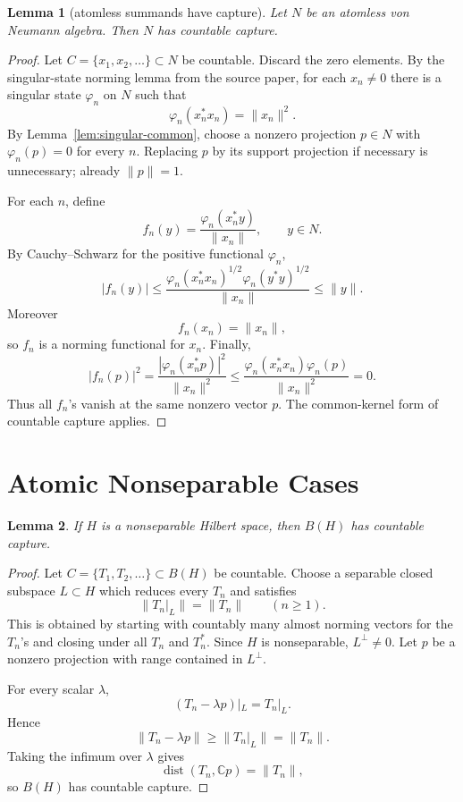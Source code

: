 \documentclass[11pt]{article}
\newtheorem{lemma}{Lemma}
\newcommand{\C}{\mathbb C}
\newcommand{\dist}{\operatorname{dist}}
\begin{document}
\begin{lemma}[atomless summands have capture]
\label{lem:atomless}
Let \(N\) be an atomless von Neumann algebra.  Then \(N\) has countable
capture.
\end{lemma}

\begin{proof}
Let \(C=\{x_1,x_2,\ldots\}\subset N\) be countable.  Discard the zero
elements.  By the singular-state norming lemma from the source paper, for
each \(x_n\ne0\) there is a singular state \(\varphi_n\) on \(N\) such that
\[
        \varphi_n(x_n^*x_n)=\|x_n\|^2.
\]
By Lemma~\ref{lem:singular-common}, choose a nonzero projection \(p\in N\)
with \(\varphi_n(p)=0\) for every \(n\).  Replacing \(p\) by its support
projection if necessary is unnecessary; already \(\|p\|=1\).

For each \(n\), define
\[
        f_n(y)=\frac{\varphi_n(x_n^*y)}{\|x_n\|},
        \qquad y\in N.
\]
By Cauchy--Schwarz for the positive functional \(\varphi_n\),
\[
        |f_n(y)|
        \le
        \frac{\varphi_n(x_n^*x_n)^{1/2}\varphi_n(y^*y)^{1/2}}{\|x_n\|}
        \le
        \|y\|.
\]
Moreover
\[
        f_n(x_n)=\|x_n\|,
\]
so \(f_n\) is a norming functional for \(x_n\).  Finally,
\[
        |f_n(p)|^2
        =
        \frac{|\varphi_n(x_n^*p)|^2}{\|x_n\|^2}
        \le
        \frac{\varphi_n(x_n^*x_n)\varphi_n(p)}{\|x_n\|^2}
        =
        0.
\]
Thus all \(f_n\)'s vanish at the same nonzero vector \(p\).  The common-kernel
form of countable capture applies.
\end{proof}

\section*{Atomic Nonseparable Cases}

\begin{lemma}
\label{lem:nonsep-bh}
If \(H\) is a nonseparable Hilbert space, then \(B(H)\) has countable
capture.
\end{lemma}

\begin{proof}
Let \(C=\{T_1,T_2,\ldots\}\subset B(H)\) be countable.  Choose a separable
closed subspace \(L\subset H\) which reduces every \(T_n\) and satisfies
\[
        \|T_n|_L\|=\|T_n\|\qquad(n\ge1).
\]
This is obtained by starting with countably many almost norming vectors for
the \(T_n\)'s and closing under all \(T_n\) and \(T_n^*\).  Since \(H\) is
nonseparable, \(L^\perp\ne0\).  Let \(p\) be a nonzero projection with
range contained in \(L^\perp\).

For every scalar \(\lambda\),
\[
        (T_n-\lambda p)|_L=T_n|_L.
\]
Hence
\[
        \|T_n-\lambda p\|
        \ge
        \|T_n|_L\|
        =
        \|T_n\|.
\]
Taking the infimum over \(\lambda\) gives
\[
        \dist(T_n,\C p)=\|T_n\|,
\]
so \(B(H)\) has countable capture.
\end{proof}
\end{document}
